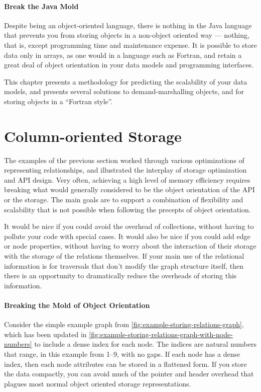 \paragraph{Break the Java Mold} Despite being an object-oriented language, there
is nothing in the Java language that prevents you from storing objects in a
non-object oriented way --- nothing, that is, except programming time and
maintenance expense. It is possible to store data only in arrays, as one would in
a language such as Fortran, and retain a great deal of object orientation in your
data models and programming interfaces. 

This chapter presents a methodology for predicting the scalability of your data
models, and presents several solutions to demand-marshalling objects, and for
storing objects in a ``Fortran style''.




\section{Column-oriented Storage}
\label{sec:column-oriented}

The examples of the previous section worked through various optimizations of
representing relationships, and illustrated the interplay of storage optimization
and API design. Very often, achieving a high level of memory efficiency requires
breaking what would generally considered to be the object orientation of the API
or the storage. The main goals are to support a combination of flexibility and
scalability that is not possible when following the precepts of object
orientation.

It would be nice if you could avoid the overhead of collections, without having
to pollute your code with special cases. It would also be nice if you could add
edge or node properties, without having to worry about the interaction of their
storage with the storage of the relations themselves. If your main use of the
relational information is for traversals that don't modify the graph structure
itself, then there is an opportunity to dramatically reduce the overheads of
storing this information.

\paragraph{Breaking the Mold of Object Orientation}

Consider the simple example graph from
\autoref{fig:example-storing-relations-graph}, which has been updated in
\autoref{fig:example-storing-relations-graph-with-node-numbers} to include a
dense index for each node. The indices are natural numbers that range, in this
example from 1--9, with no gaps. If each node has a dense index, then each node
attributes can be stored in a flattened form. If you store the data compactly,
you can avoid much of the pointer and header overhead that plagues most normal
object oriented storage representations.

